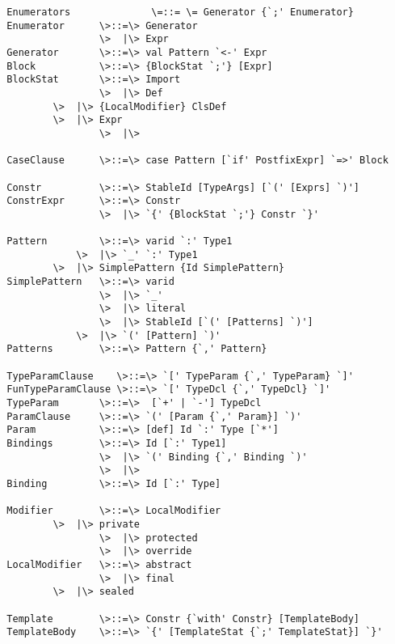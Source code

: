 \documentclass[11pt]{report}
\begin{document}
\begin{verbatim}
  Enumerators              \=::= \= Generator {`;' Enumerator}
  Enumerator      \>::=\> Generator
                  \>  |\> Expr
  Generator       \>::=\> val Pattern `<-' Expr
  Block           \>::=\> {BlockStat `;'} [Expr]
  BlockStat       \>::=\> Import
                  \>  |\> Def
		  \>  |\> {LocalModifier} ClsDef
		  \>  |\> Expr
                  \>  |\>

  CaseClause      \>::=\> case Pattern [`if' PostfixExpr] `=>' Block 

  Constr          \>::=\> StableId [TypeArgs] [`(' [Exprs] `)']  
  ConstrExpr      \>::=\> Constr 
                  \>  |\> `{' {BlockStat `;'} Constr `}'

  Pattern         \>::=\> varid `:' Type1
	          \>  |\> `_' `:' Type1
		  \>  |\> SimplePattern {Id SimplePattern}
  SimplePattern   \>::=\> varid
                  \>  |\> `_'
                  \>  |\> literal
                  \>  |\> StableId [`(' [Patterns] `)']
	          \>  |\> `(' [Pattern] `)'
  Patterns        \>::=\> Pattern {`,' Pattern}

  TypeParamClause    \>::=\> `[' TypeParam {`,' TypeParam} `]'
  FunTypeParamClause \>::=\> `[' TypeDcl {`,' TypeDcl} `]'
  TypeParam       \>::=\>  [`+' | `-'] TypeDcl
  ParamClause     \>::=\> `(' [Param {`,' Param}] `)'
  Param           \>::=\> [def] Id `:' Type [`*']
  Bindings        \>::=\> Id [`:' Type1]
                  \>  |\> `(' Binding {`,' Binding `)'
                  \>  |\>
  Binding         \>::=\> Id [`:' Type]

  Modifier        \>::=\> LocalModifier
		  \>  |\> private
                  \>  |\> protected
                  \>  |\> override 
  LocalModifier   \>::=\> abstract
                  \>  |\> final
		  \>  |\> sealed

  Template        \>::=\> Constr {`with' Constr} [TemplateBody]
  TemplateBody    \>::=\> `{' [TemplateStat {`;' TemplateStat}] `}'
\end{verbatim}
\end{document}
